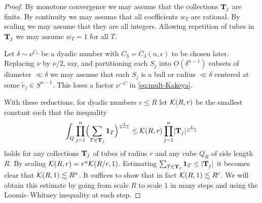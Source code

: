\begin{proof}
By monotone convergence we may assume that the collections $\mathbf{T}_{j}$ are finite.
By continuity we may assume that all coefficients $w_{T}$ are rational.
By scaling we may assume that they are all integers.
Allowing repetition of tubes in $\mathbf{T}_{j}$ we may assume $w_{T}=1$ for all $T$.

Let $\delta \sim \nu^{C_{3}}$ be a dyadic number with $C_{3} = C_{3}(n,\epsilon)$ to be chosen later.
Replacing $\nu$ by $\nu/2$, say, and partitioning each $S_{j}$ into $O(\delta^{n-1})$ subsets of diameter $\ll \delta$ we may assume that each $S_{j}$ is a ball or radius $\ll \delta$ centered at some $\tilde{e}_{j} \in S^{n-1}$.
This loses a factor $\nu^{-C}$ in \eqref{eq:mult-Kakeya}.

With these reductions, for dyadic numbers $r\leq R$ let $\mathcal{K}(R,r)$ be the smallest constant such that the inequality
\[
\int_{Q} \prod_{j=1}^n \Bigl( \sum_{T \in \mathbf{T}_{j}} \mathbf{1}_{T} \Bigr)^{\frac{1}{n-1}}
\leq
\mathcal{K}(R,r) \prod_{j=1}^n \lvert\mathbf{T}_{j}\rvert^{\frac{1}{n-1}}
\]
holds for any collections $\mathbf{T}_{j}$ of tubes of radius $r$ and any cube $Q_{R}$ of side length $R$.
By scaling $\mathcal{K}(R,r) = r^{n} \mathcal{K}(R/r,1)$.
Estimating $\sum_{T \in \mathbf{T}_{j}} \mathbf{1}_{T} \leq \lvert\mathbf{T}_{j}\rvert$ it becomes clear that $\mathcal{K}(R,1) \lesssim R^{n}$.
It suffices to show that in fact $\mathcal{K}(R,1) \lesssim R^{\varepsilon}$.
We will obtain this estimate by going from scale $R$ to scale $1$ in many steps and using the Loomis--Whitney inequality at each step.


\end{proof}
